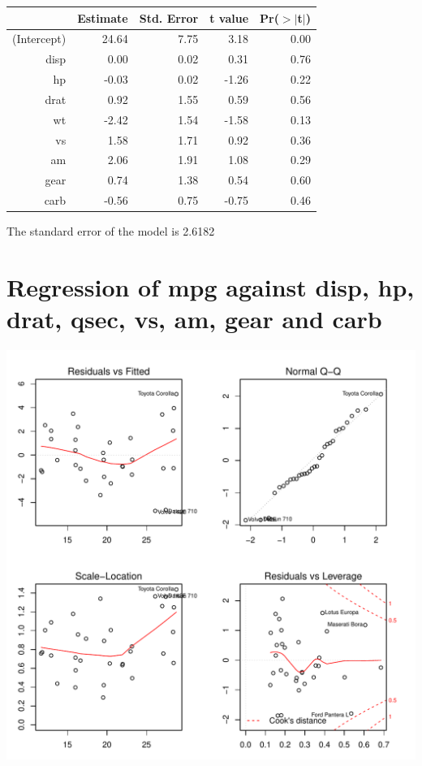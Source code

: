 \documentclass{article}\usepackage[]{graphicx}\usepackage[]{color}
\makeatletter
\def\maxwidth{ %
  \ifdim\Gin@nat@width>\linewidth
    \linewidth
  \else
    \Gin@nat@width
  \fi
}
\newenvironment{knitrout}{}{} %
\makeatother
\begin{document}
\begin{table}[ht]
\centering
\begin{tabular}{rrrrr}
  \hline
 & Estimate & Std. Error & t value & Pr($>$$|$t$|$) \\ 
  \hline
(Intercept) & 24.64 & 7.75 & 3.18 & 0.00 \\ 
  disp & 0.00 & 0.02 & 0.31 & 0.76 \\ 
  hp & -0.03 & 0.02 & -1.26 & 0.22 \\ 
  drat & 0.92 & 1.55 & 0.59 & 0.56 \\ 
  wt & -2.42 & 1.54 & -1.58 & 0.13 \\ 
  vs & 1.58 & 1.71 & 0.92 & 0.36 \\ 
  am & 2.06 & 1.91 & 1.08 & 0.29 \\ 
  gear & 0.74 & 1.38 & 0.54 & 0.60 \\ 
  carb & -0.56 & 0.75 & -0.75 & 0.46 \\ 
   \hline
\end{tabular}
\end{table}




The standard error of the model is 2.6182

\newpage

\section{Regression of mpg against disp, hp, drat, qsec, vs, am, gear and carb }
\begin{knitrout}
\color{fgcolor}

{\centering \includegraphics[width=\maxwidth]{figure/lm-disp-hp-drat-qsec-vs-am-gear-carb} 

}



\end{knitrout}
\end{document}

